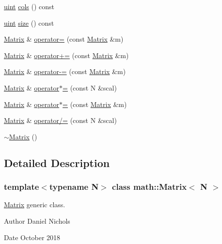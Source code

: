 \begin{DoxyCompactItemize}
\item 
\hyperlink{typedefs_8h_a7b9b9413622e67b9df7f2d090b48682b}{uint} \hyperlink{classmath_1_1Matrix_ad78b49e12a607856df124a18a855aaf1}{cols} () const
\item 
\hyperlink{typedefs_8h_a7b9b9413622e67b9df7f2d090b48682b}{uint} \hyperlink{classmath_1_1Matrix_ae99135c51efc0077b694ab37ad64d5c0}{size} () const
\item 
\hyperlink{classmath_1_1Matrix}{Matrix} \& \hyperlink{classmath_1_1Matrix_a8bf5d371b703ef3023742c4058f709a7}{operator=} (const \hyperlink{classmath_1_1Matrix}{Matrix} \&m)
\item 
\hyperlink{classmath_1_1Matrix}{Matrix} \& \hyperlink{classmath_1_1Matrix_ae2944c1e1a0f1958101db2197bcfaa3c}{operator+=} (const \hyperlink{classmath_1_1Matrix}{Matrix} \&m)
\item 
\hyperlink{classmath_1_1Matrix}{Matrix} \& \hyperlink{classmath_1_1Matrix_a046b9f4717da34fb08795cb461497084}{operator-\/=} (const \hyperlink{classmath_1_1Matrix}{Matrix} \&m)
\item 
\hyperlink{classmath_1_1Matrix}{Matrix} \& \hyperlink{classmath_1_1Matrix_a1704c2b9fd200a6854b6793524a15700}{operator$\ast$=} (const N \&scal)
\item 
\hyperlink{classmath_1_1Matrix}{Matrix} \& \hyperlink{classmath_1_1Matrix_a4dbf1e0c5f42ce314ea2510a025b7e2a}{operator$\ast$=} (const \hyperlink{classmath_1_1Matrix}{Matrix} \&m)
\item 
\hyperlink{classmath_1_1Matrix}{Matrix} \& \hyperlink{classmath_1_1Matrix_a6a0a90575952ca84cac100cb40a5e9d0}{operator/=} (const N \&scal)
\item 
\hyperlink{classmath_1_1Matrix_afd52712eaef5a16115d605b7866a0576}{$\sim$\+Matrix} ()
\end{DoxyCompactItemize}


\subsection{Detailed Description}
\subsubsection*{template$<$typename N$>$\newline
class math\+::\+Matrix$<$ N $>$}

\hyperlink{classmath_1_1Matrix}{Matrix} generic class. 

\begin{DoxyAuthor}{Author}
Daniel Nichols 
\end{DoxyAuthor}
\begin{DoxyDate}{Date}
October 2018 
\end{DoxyDate}


